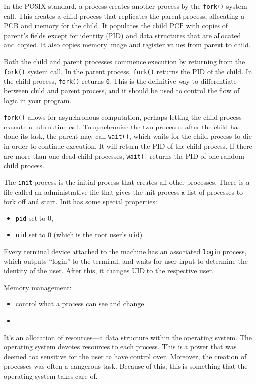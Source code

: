 \documentclass[code]{amznotes}
\begin{document}
In the POSIX standard, a process creates another process by the \texttt{fork()} system call. This creates a child process that replicates the parent process, allocating a PCB and memory for the child. It populates the child PCB with copies of parent's fields except for identity (PID) and data structures that are allocated and copied. It also copies memory image and register values from parent to child.

Both the child and parent processes commence execution by returning from the \texttt{fork()} system call. In the parent process, \texttt{fork()} returns the PID of the child. In the child process, \texttt{fork()} returns \texttt{0}. This is the definitive way to differentiate between child and parent process, and it should be used to control the flow of logic in your program.

\texttt{fork()} allows for asynchronous computation, perhaps letting the child process execute a subroutine call. To synchronize the two processes after the child has done its task, the parent may call \texttt{wait()}, which waits for the child process to die in order to continue execution. It will return the PID of the child process. If there are more than one dead child processes, \texttt{wait()} returns the PID of one random child process.

The \texttt{init} process is the initial process that creates all other processes. There is a file called an administrative file that gives the init process a list of processes to fork off and start. Init has some special properties:
\begin{itemize}
    \item \texttt{pid} set to 0,
    \item \texttt{uid} set to 0 (which is the root user's \texttt{uid})
\end{itemize}
Every terminal device attached to the machine has an associated \texttt{login} process, which outputs ``login'' to the terminal, and waits for user input to determine the identity of the user. After this, it changes UID to the respective user.

Memory management:
\begin{itemize}
    \item control what a process can see and change
    \item 
\end{itemize}

It's an allocation of resources---a data structure within the operating system. The operating system devotes resources to each process. This is a power that was deemed too sensitive for the user to have control over. Moreover, the creation of processes was often a dangerous task. Because of this, this is something that the operating system takes care of.
\end{document}
